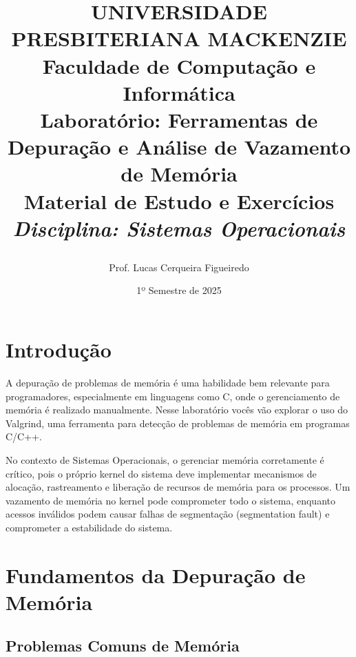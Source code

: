 \documentclass[11pt,a4paper]{article}
\title{%
    \vspace{-1.5cm}
    \begin{center}
    \end{center}
    \vspace{0.5cm}
    {\LARGE\bfseries UNIVERSIDADE PRESBITERIANA MACKENZIE}\\
    {\large Faculdade de Computação e Informática}\\
    \vspace{1.0cm}
    {\Huge\bfseries\color{mackblue} Laboratório: Ferramentas de Depuração e Análise de Vazamento de Memória}\\
    \vspace{0.5cm}
    {\LARGE\bfseries Material de Estudo e Exercícios}\\
    \vspace{0.3cm}
    {\large\itshape Disciplina: Sistemas Operacionais}
}
\author{{\large Prof. Lucas Cerqueira Figueiredo}}
\date{{\large 1º Semestre de 2025}}
\begin{document}
\maketitle
\thispagestyle{empty}

\tableofcontents
\newpage

\section{Introdução}

A depuração de problemas de memória é uma habilidade bem relevante para programadores, especialmente em linguagens como C, onde o gerenciamento de memória é realizado manualmente. Nesse laboratório vocês vão explorar o uso do Valgrind, uma ferramenta para detecção de problemas de memória em programas C/C++.

No contexto de Sistemas Operacionais, o gerenciar memória corretamente é crítico, pois o próprio kernel do sistema deve implementar mecanismos de alocação, rastreamento e liberação de recursos de memória para os processos. Um vazamento de memória no kernel pode comprometer todo o sistema, enquanto acessos inválidos podem causar falhas de segmentação (segmentation fault) e comprometer a estabilidade do sistema.

\section{Fundamentos da Depuração de Memória}

\subsection{Problemas Comuns de Memória}
\end{document}
